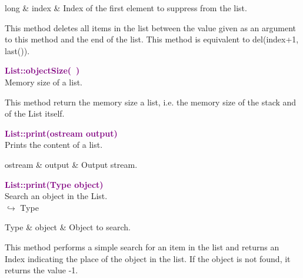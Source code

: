 \begin{tcolorbox}[width=\textwidth,myArgs,tabularx={ll|R}]
long & index & Index of the first element to suppress from the list.
\end{tcolorbox}

This method deletes all items in the list between the value given as an argument to this method and the end of the list.
This method is equivalent to del(index+1, last()).

\textcolor{purple}{\textbf{List::objectSize(~)}}\label{List::objectSize()}\\
Memory size of a list.

This method return the memory size a list, i.e. the memory size of the stack and of the List itself.

\textcolor{purple}{\textbf{List::print(ostream output)}}\label{List::print(ostream output)}\\
Prints the content of a list.

\begin{tcolorbox}[width=\textwidth,myArgs,tabularx={ll|R}]
ostream & output & Output stream.
\end{tcolorbox}


\textcolor{purple}{\textbf{List::print(Type object)}}\label{List::print(Type object)}\\
Search an object in the List.\\ \hspace*{10mm}$\hookrightarrow$ Type

\begin{tcolorbox}[width=\textwidth,myArgs,tabularx={ll|R}]
Type & object & Object to search.
\end{tcolorbox}

This method performs a simple search for an item in the list and returns an Index indicating the place of the object in the list.
If the object is not found, it returns the value -1.

